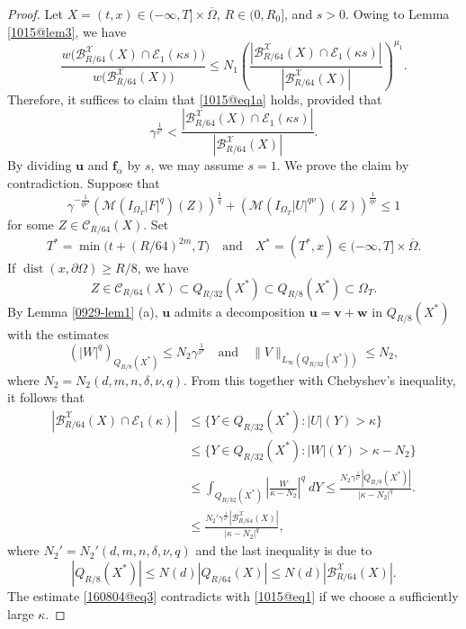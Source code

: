 \documentclass[reqno]{amsart}
\numberwithin{equation}{section}
\theoremstyle{plain}
\theoremstyle{definition}
\theoremstyle{remark}
\begin{document}
\begin{proof}
Let  $X=(t,x)\in (-\infty,T]\times \overline{\Omega}$, $R\in (0,R_0]$, and $s>0$.
Owing to Lemma \ref{1015@lem3}, we have 
$$
\frac{w\big({\mathcal{B}}_{R/64}^{\mathcal{X}}(X)\cap {\mathcal{E}}_1(\kappa s)\big)}{w\big({\mathcal{B}}_{R/64}^{\mathcal{X}}(X)\big)}\le N_1\left(\frac{|{\mathcal{B}}_{R/64}^{\mathcal{X}}(X) \cap {\mathcal{E}}_1(\kappa s)|}{|{\mathcal{B}}_{R/64}^{\mathcal{X}}(X)|}\right)^{\mu_1}.
$$
Therefore, it suffices to claim that \eqref{1015@eq1a} holds, provided that 
\begin{equation}		\label{1015@eq1}		
\gamma^{\frac{1}{\nu'}}<\frac{|{\mathcal{B}}_{R/64}^{\mathcal{X}}(X)\cap {\mathcal{E}}_1(\kappa s)|}{|{\mathcal{B}}_{R/64}^{\mathcal{X}}(X)|}.
\end{equation}
By dividing ${\boldsymbol{u}}$ and ${\boldsymbol{f}}_\alpha$ by $s$, we may assume $s=1$.
We prove the claim by contradiction.
Suppose that 
\[
\gamma^{-\frac{1}{q\nu'}}({\mathcal{M}}(I_{\Omega_T}|F|^{q})(Z))^{\frac{1}{q}}+({\mathcal{M}}(I_{\Omega_T}|U|^{q\nu})(Z))^{\frac{1}{q\nu}}\le 1
\]
for some $Z\in {\mathcal{C}}_{R/64}(X)$.
Set 
$$
T^*=\min \big(t+(R/64)^{2m},T\big) \quad \text{and}\quad X^*=(T^*,x)\in (-\infty,T]\times \overline{\Omega}.
$$
If $\operatorname{dist} (x,\partial \Omega)\ge R/8$,  we have 
\[
Z\in {\mathcal{C}}_{R/64}(X)\subset Q_{R/32}(X^*)\subset Q_{R/8}(X^*)\subset\Omega_T.
\]
By Lemma \ref{0929-lem1} (a), ${\boldsymbol{u}}$ admits a decomposition ${\boldsymbol{u}}={\boldsymbol{v}}+{\boldsymbol{w}}$ in $Q_{R/8}(X^*)$ with the estimates
\[
(|W|^{q})_{Q_{R/8}(X^*)}\le N_2\gamma^{\frac{1}{\nu'}} \quad \text{and}\quad \|V\|_{L_\infty(Q_{R/32}(X^*))}\le N_2,
\]
where $N_2=N_2(d,m,n,\delta,\nu,q)$.
From this together with Chebyshev's inequality, it follows that 
\begin{align}
\nonumber
|{\mathcal{B}}_{R/64}^{\mathcal{X}}(X)\cap {\mathcal{E}}_1(\kappa)|&\le \{Y\in Q_{R/32}(X^*):|U|(Y)>\kappa\}\\
\nonumber
&\le \{Y\in Q_{R/32}(X^*):|W|(Y)>\kappa-N_2\}\\
\nonumber
&\le \int_{Q_{R/32}(X^*)}\left|\frac{W}{\kappa-N_2}\right|^{q} \ dY\le \frac{N_2\gamma^{\frac{1}{\nu'}}|Q_{R/8}(X^*)|}{|\kappa-N_2|^{q}}.\\
\label{160804@eq3}
&\le \frac{N_2'\gamma^{\frac{1}{\nu'}}|{\mathcal{B}}_{R/64}^{\mathcal{X}} (X)|}{|\kappa-N_2|^{q}},
\end{align}
where $N_2'=N_2'(d,m,n,\delta,\nu,q)$
and the last inequality is due to 
$$
|Q_{R/8}(X^*)|\le N(d)|Q_{R/64}(X)|\le N(d)|{\mathcal{B}}^{\mathcal{X}}_{R/64}(X)|.
$$
The estimate \eqref{160804@eq3} contradicts with \eqref{1015@eq1} if we choose a sufficiently large $\kappa$.


\end{proof}
\end{document}
